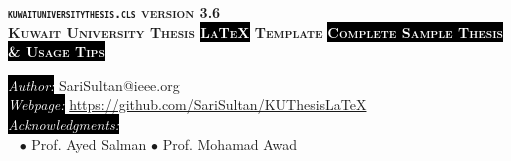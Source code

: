 \thispagestyle{empty}
\mbox{} \vfil
\begin{center}
	\scshape
	{\hspace{2.5cm} \mbox{} \vspace{-10pt} \bfseries  \texttt{kuwaituniversitythesis.cls} version {\Large 3.6}} \\
	
	
{\fontsize{82pt}{2pt} \bfseries Kuwait University Thesis \colorbox{black}{\textcolor{white}{\LaTeX}} Template}
{\fontsize{22pt}{2pt} \bfseries  \colorbox{black}{\textcolor{white}{Complete Sample Thesis \& Usage Tips}}  }



\vfil

\begingroup
\normalfont
\raggedright
{\colorbox{black}{\textcolor{white}{\emph{Author:}}} \fontsize{10}{2pt}  SariSultan@ieee.org}\\
{\colorbox{black}{\textcolor{white}{\emph{Webpage:}}}}{ \fontsize{10}{2pt} \normalfont \href{https://github.com/SariSultan/KUThesisLaTeX}{https://github.com/SariSultan/KUThesisLaTeX}}\\
{\colorbox{black}{\textcolor{white}{\emph{Acknowledgments:}}}}~\\~
	{\hspace{1cm} \mbox{}$\bullet$ Prof. Ayed Salman}	{\hspace{1cm} \mbox{}$\bullet$ Prof. Mohamad Awad}
\endgroup
\end{center}

